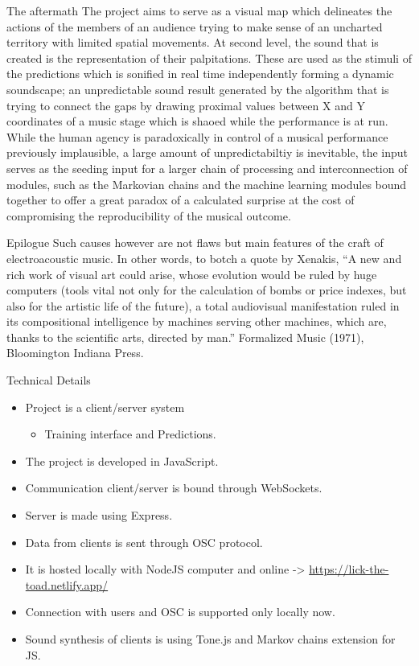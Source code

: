 \documentclass[bigger]{beamer}
\begin{document}
\begin{frame}[label={sec:orgceef018}]{The aftermath}
The project aims to serve as a visual map which delineates the actions of the members of an audience trying to make sense of an uncharted territory with limited spatial movements. At second level, the sound that is created is the representation of their palpitations. These are used as the stimuli of the predictions which is sonified in real time independently forming a dynamic soundscape; an unpredictable sound result generated by the algorithm that is trying to connect the gaps by drawing proximal values between X and Y coordinates of a music stage which is shaoed while the performance is at run. While the human agency is paradoxically in control of a musical performance previously implausible, a large amount of unpredictabiltiy is inevitable, the input serves as the seeding input for a larger chain of processing and interconnection of modules, such as the Markovian chains and the machine learning modules bound together to offer a great paradox of a calculated surprise at the cost of compromising the reproducibility of the musical outcome.
\end{frame}
\begin{frame}[label={sec:orga79941c}]{Epilogue}
Such causes however are not flaws but main features of the craft of electroacoustic music. In other words, to botch a quote by Xenakis, ``A new and rich work of visual art could arise, whose evolution would be ruled by huge computers (tools vital not only for the calculation of bombs or price indexes, but also for the artistic life of the future), a total audiovisual manifestation ruled in its compositional intelligence by machines serving other machines, which are, thanks to the scientific arts, directed by man.'' Formalized Music (1971), Bloomington Indiana Press.
\end{frame}
\begin{frame}[label={sec:org6d2cacb}]{Technical Details}
\begin{itemize}
\item Project is a client/server system
\begin{itemize}
\item Training interface and Predictions.
\end{itemize}
\item The project is developed in JavaScript.
\item Communication client/server is bound through WebSockets.
\item Server is made using Express.
\item Data from clients is sent through OSC protocol.
\item It is hosted locally with NodeJS computer and online -> \url{https://lick-the-toad.netlify.app/}
\item Connection with users and OSC is supported only locally now.
\item Sound synthesis of clients is using Tone.js and Markov chains extension for JS.
\end{itemize}
\end{frame}
\end{document}
